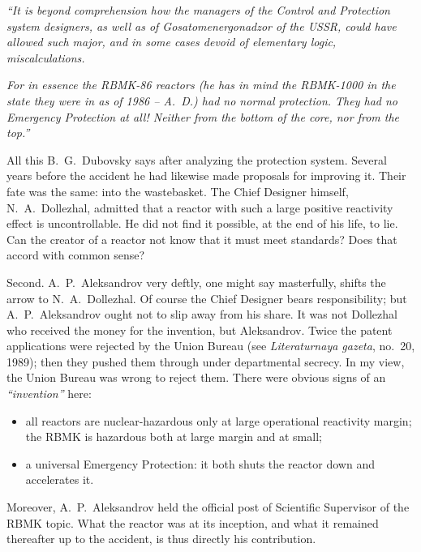 \documentclass[openright]{bookest}
\begin{document}
\begin{personal}
\textit{``It is beyond comprehension how the managers of the Control and Protection system designers, as well as of Gosatomenergonadzor of the USSR, could have allowed such major, and in some cases devoid of elementary logic, miscalculations.}

\textit{For in essence the RBMK-86 reactors (he has in mind the RBMK-1000 in the state they were in as of 1986 -- A.~D.) had no normal protection. They had no Emergency Protection at all! Neither from the bottom of the core, nor from the top.''}
\end{personal}

All this B.~G.~Dubovsky says after analyzing the protection system. Several years before the accident he had likewise made proposals for improving it. Their fate was the same: into the wastebasket. The Chief Designer himself, N.~A.~Dollezhal, admitted that a reactor with such a large positive reactivity effect is uncontrollable. He did not find it possible, at the end of his life, to lie. Can the creator of a reactor not know that it must meet standards? Does that accord with common sense?

Second. A.~P.~Aleksandrov very deftly, one might say masterfully, shifts the arrow to N.~A.~Dollezhal. Of course the Chief Designer bears responsibility; but A.~P.~Aleksandrov ought not to slip away from his share. It was not Dollezhal who received the money for the invention, but Aleksandrov. Twice the patent applications were rejected by the Union Bureau (see \textit{Literaturnaya gazeta}, no.~20, 1989); then they pushed them through under departmental secrecy. In my view, the Union Bureau was wrong to reject them. There were obvious signs of an \textit{``invention''} here:

\begin{itemize}
\item all reactors are nuclear-hazardous only at large operational reactivity margin; the RBMK is hazardous both at large margin and at small;
\item a universal Emergency Protection: it both shuts the reactor down and accelerates it.
\end{itemize}

Moreover, A.~P.~Aleksandrov held the official post of Scientific Supervisor of the RBMK topic. What the reactor was at its inception, and what it remained thereafter up to the accident, is thus directly his contribution.
\end{document}

